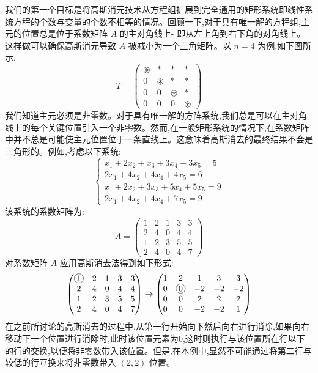 \documentclass[10pt, a4paper]{article}
\newcommand{\circlednum}[1]{%
    \tikz[baseline=(char.base)]{%
        \node[draw, circle, inner sep=1pt] (char) {#1};%
    }%
}
\begin{document}
我们的第一个目标是将高斯消元技术从方程组扩展到完全通用的矩形系统即线性系统方程的个数与变量的个数不相等的情况。回顾一下,对于具有唯一解的方程组,主元的位置总是位于系数矩阵 \(A\) 的主对角线上- 即从左上角到右下角的对角线上。这样做可以确保高斯消元导致 \(A\) 被减小为一个三角矩阵。以 \(n=4\) 为例,如下图所示:
\[
T=\begin{pmatrix} 
\circledast & * & * & * \\ 
0 & \circledast & * & * \\ 
0 & 0 & \circledast & * \\ 
0 & 0 & 0 & \circledast 
\end{pmatrix}
\]
我们知道主元必须是非零数。对于具有唯一解的方阵系统,我们总是可以在主对角线上的每个关键位置引入一个非零数。然而,在一般矩形系统的情况下,在系数矩阵中并不总是可能使主元位置位于一条直线上。这意味着高斯消去的最终结果不会是三角形的。例如,考虑以下系统:
\[
\begin{cases} 
x_{1}+2 x_{2}+x_{3}+3 x_{4}+3 x_{5}=5 \\ 
2 x_{1}+4 x_{2}+4 x_{4}+4 x_{5}=6 \\ 
x_{1}+2 x_{2}+3 x_{3}+5 x_{4}+5 x_{5}=9 \\ 
2 x_{1}+4 x_{2}+4 x_{4}+7 x_{5}=9 
\end{cases}
\]
该系统的系数矩阵为:
\[
A=\begin{pmatrix} 
1 & 2 & 1 & 3 & 3 \\ 
2 & 4 & 0 & 4 & 4 \\ 
1 & 2 & 3 & 5 & 5 \\ 
2 & 4 & 0 & 4 & 7 
\end{pmatrix}
\]
对系数矩阵 \(A\) 应用高斯消去法得到如下形式:
\[
\begin{pmatrix} 
\circlednum{1} & 2 & 1 & 3 & 3 \\ 
2 & 4 & 0 & 4 & 4 \\ 
1 & 2 & 3 & 5 & 5 \\ 
2 & 4 & 0 & 4 & 7 
\end{pmatrix}
\to
\begin{pmatrix} 
1 & 2 & 1 & 3 & 3 \\ 
0 & \circlednum{0} & -2 & -2 & -2 \\ 
0 & 0 & 2 & 2 & 2 \\ 
0 & 0 & -2 & -2 & 1 
\end{pmatrix}
\]
在之前所讨论的高斯消去的过程中,从第一行开始向下然后向右进行消除,如果向右移动下一个位置进行消除时,此时该位置元素为0,这时则执行与该位置所在行以下的行的交换,以便将非零数带入该位置。但是,在本例中,显然不可能通过将第二行与较低的行互换来将非零数带入 \((2,2)\) 位置。
\end{document}
